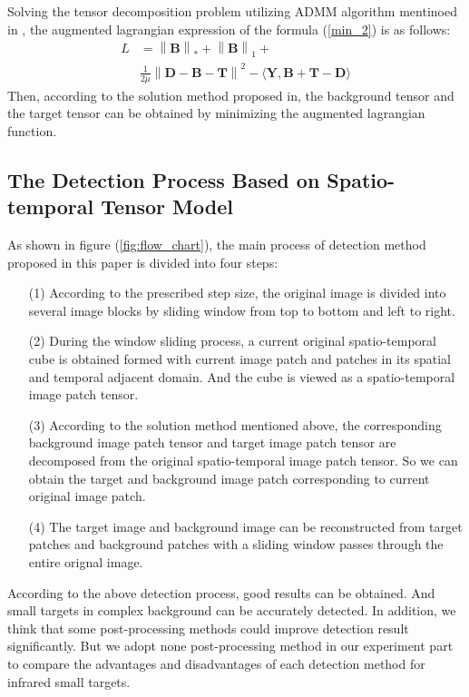 \documentclass[journal]{IEEEtran}
\begin{document}
Solving the tensor decomposition problem utilizing ADMM algorithm mentinoed in \cite{dai2017reweighted}, the augmented lagrangian expression of the formula (\ref{min_2}) is as follows:
\begin{equation}
  \begin{split}
    L & = \left \|\bm{B} \right \| _* +\left \|\bm{B} \right \| _1 + \\
    & \frac{1}{2\mu} \left \|\bm{D}-\bm{B}-\bm{T} \right \| ^2 - \langle\bm{Y},\bm{B}+\bm{T}-\bm{D}\rangle
  \end{split}
\end{equation}
Then, according to the solution method proposed in\cite{dai2017reweighted}, the background tensor and the target tensor can be obtained by minimizing the augmented lagrangian function.


\subsection{The Detection Process Based on Spatio-temporal Tensor Model}
As shown in figure (\ref{fig:flow_chart}), the main process of detection method proposed in this paper is 
divided into four steps:
\begin{itemize}
  \item [(1)]According to the prescribed step size, the original image is divided into several image blocks by sliding window from top to bottom and left to right.
  \item [(2)]During the window sliding process, a current original spatio-temporal cube is obtained formed with current image patch and patches in its spatial and temporal adjacent domain. And the cube is viewed as a spatio-temporal image patch tensor.
  \item [(3)]According to the solution method mentioned above, the corresponding background image patch tensor and target image patch tensor are decomposed from the original spatio-temporal image patch tensor. So we can obtain the target and background image patch corresponding to current original image patch.
  \item [(4)]The target image and background image can be reconstructed from target patches and background patches with a sliding window passes through the entire orignal image.
\end{itemize}
According to the above detection process, good results can be obtained. And small targets in complex background can be accurately detected. In addition, we think that some post-processing methods could improve detection result significantly. But we adopt none post-processing method in our experiment part to compare the advantages and disadvantages of each detection method for infrared small targets.
\end{document}
